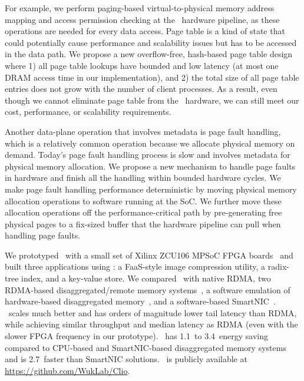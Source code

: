For example, we perform paging-based virtual-to-physical memory address mapping and access permission checking at the \MN\ hardware pipeline, as these operations are needed for every data access.
Page table is a kind of state that could potentially cause performance and scalability issues but has to be accessed in the data path.
We propose a new overflow-free, hash-based page table design where 1) all page table lookups have bounded and low latency (at most one DRAM access time in our implementation), and 2) the total size of all page table entries does not grow with the number of client processes.
As a result, even though we cannot eliminate page table from the \MN\ hardware, we can still meet our cost, performance, or scalability requirements.

Another data-plane operation that involves metadata is page fault handling, which is a relatively common operation because we allocate physical memory on demand.
Today's page fault handling process is slow and involves metadata for physical memory allocation.
We propose a new mechanism to handle page faults in hardware and finish all the handling within bounded hardware cycles.
We make page fault handling performance deterministic by moving  physical memory allocation operations to software running at the SoC.
We further move these allocation operations off the performance-critical path by pre-generating free physical pages to a fix-sized buffer that the hardware pipeline can pull when handling page faults.

We prototyped \sysboard\ with a small set of Xilinx ZCU106 MPSoC FPGA boards~\cite{ZCU106} and built three applications using \sys:
a FaaS-style image compression utility, a radix-tree index, and a key-value store.
We compared \sys\ with native RDMA, two RDMA-based disaggregated/remote memory systems~\cite{Tsai20-ATC,Kalia14-RDMAKV}, 
a software emulation of hardware-based disaggregated memory~\cite{Shan18-OSDI},
and a software-based SmartNIC~\cite{BlueField}.
\sys\ scales much better and has orders of magnitude lower tail latency than RDMA, 
while achieving similar throughput and median latency as RDMA (even with the slower FPGA frequency in our prototype).
\sys\ has 1.1\x\ to 3.4\x\ energy saving compared to CPU-based and SmartNIC-based disaggregated memory systems 
and is 2.7\x\ faster than SmartNIC solutions. 
\sys\ is publicly available at \url{https://github.com/WukLab/Clio}.



